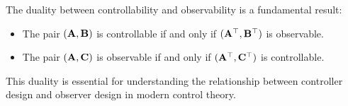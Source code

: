 The duality between controllability and observability is a fundamental result:
\begin{itemize}
    \item The pair $(\mathbf{A}, \mathbf{B})$ is controllable if and only if $(\mathbf{A}^\top, \mathbf{B}^\top)$ is observable.
    \item The pair $(\mathbf{A}, \mathbf{C})$ is observable if and only if $(\mathbf{A}^\top, \mathbf{C}^\top)$ is controllable.
\end{itemize}

This duality is essential for understanding the relationship between controller design and observer design in modern control theory.

